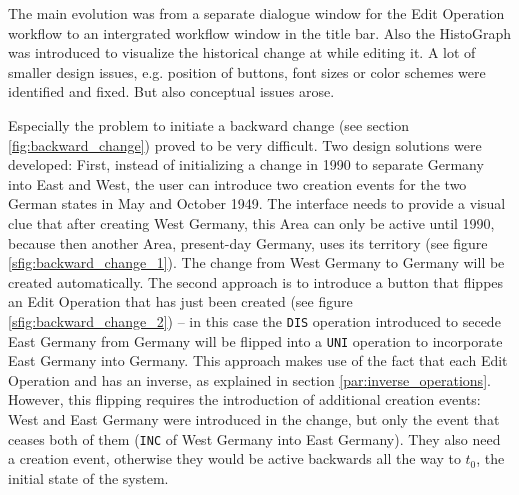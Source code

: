 The main evolution was from a separate dialogue window for the Edit Operation workflow to an intergrated workflow window in the title bar. Also the HistoGraph was introduced to visualize the historical change at while editing it. A lot of smaller design issues, e.g. position of buttons, font sizes or color schemes were identified and fixed. But also conceptual issues arose.

Especially the problem to initiate a backward change (see section \ref{fig:backward_change}) proved to be very difficult. Two design solutions were developed: First, instead of initializing a change in 1990 to separate Germany into East and West, the user can introduce two creation events for the two German states in May and October 1949. The interface needs to provide a visual clue that after creating West Germany, this Area can only be active until 1990, because then another Area, present-day Germany, uses its territory (see figure \ref{sfig:backward_change_1}). The change from West Germany to Germany will be created automatically. The second approach is to introduce a button that flippes an Edit Operation that has just been created (see figure \ref{sfig:backward_change_2}) -- in this case the \texttt{DIS} operation introduced to secede East Germany from Germany will be flipped into a \texttt{UNI} operation to incorporate East Germany into Germany. This approach makes use of the fact that each Edit Operation and has an inverse, as explained in section \ref{par:inverse_operations}.
However, this flipping requires the introduction of additional creation events: West and East Germany were introduced in the change, but only the event that ceases both of them (\texttt{INC} of West Germany into East Germany). They also need a creation event, otherwise they would be active backwards all the way to $t_0$, the initial state of the system.


